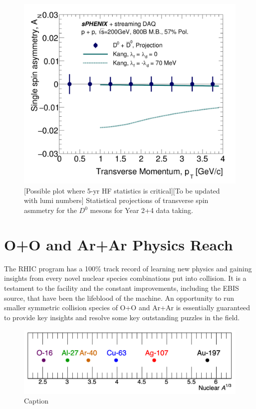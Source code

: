 \begin{figure}[htbp]
\begin{center}
\includegraphics[width=.49\linewidth]{figs/RAA_DB_theory_root_AN_D0D0bar.pdf}
\caption{[Possible plot where  5-yr HF statistics is critical][To be updated with lumi numbers] Statistical projections of
  transverse spin asmmetry for the $D^0$ mesons for Year
  2+4 data taking.} 
\label{fig:AN-D0}
\end{center}
\end{figure}


\section{O+O and Ar+Ar Physics Reach}

The RHIC program has a 100\% track record of learning new physics and gaining insights from every novel nuclear species combinations put into collision.    It is a testament to the facility and the constant improvements, including the EBIS source, that have been the lifeblood of the machine.    An opportunity to run smaller symmetric collision species of O+O and Ar+Ar is essentially guaranteed to provide key insights and resolve some key outstanding puzzles in the field.  

\begin{figure}
    \centering
    \includegraphics[width=0.85\linewidth]{figs/figure_A.png}
    \caption{Caption}
    \label{fig:figA}
\end{figure}

